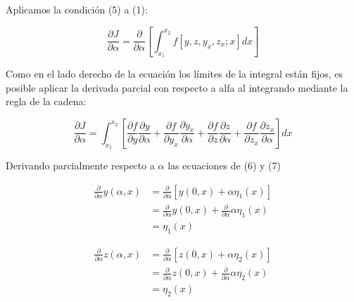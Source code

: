 
\vspace{0.5cm}

Aplicamos la condición (5) a (1):

\begin{equation*}
    \frac{\partial J}{\partial \alpha} =
    \frac{\partial}{\partial \alpha}
    \left[
        \int_{x_{1}}^{x_{2}}
        f\left[ y, z, y_{x}, z_{x}; x \right]
        dx
        \right]
\end{equation*}

\vspace*{0.5cm}

Como en el lado derecho de la ecuación los límites de la integral están fijos, es posible aplicar la derivada parcial
con respecto a alfa al integrando mediante la regla de la cadena:

\vspace*{0.5cm}

\begin{equation}
    \frac{\partial J}{\partial \alpha} =
    \int_{x_{1}}^{x_{2}}
    \left[
        \frac{\partial f}{\partial y} \frac{\partial y}{\partial \alpha} +
        \frac{\partial f}{\partial y_{x}} \frac{\partial y_{x}}{\partial \alpha} +
        \frac{\partial f}{\partial z} \frac{\partial z}{\partial \alpha} +
        \frac{\partial f}{\partial z_{x}} \frac{\partial z_{x}}{\partial \alpha}
        \right]
    dx
\end{equation}

\vspace*{0.5cm}

Derivando parcialmente respecto a $\alpha$ las ecuaciones de (6) y (7)

\begin{align*}
    \frac{\partial}{\partial \alpha} y(\alpha,x) & = \frac{\partial}{\partial \alpha} \left[ y(0,x) + \alpha \eta_{1} (x) \right]                    \\
                                                 & = \frac{\partial}{\partial \alpha}  y(0,x) + \frac{\partial}{\partial \alpha} \alpha \eta_{1} (x) \\
                                                 & = \eta_{1} (x)
\end{align*}

\vspace*{0.5cm}

\begin{align*}
    \frac{\partial}{\partial \alpha} z(\alpha,x) & = \frac{\partial}{\partial \alpha} \left[ z(0,x) + \alpha \eta_{2} (x) \right]                    \\
                                                 & = \frac{\partial}{\partial \alpha}  z(0,x) + \frac{\partial}{\partial \alpha} \alpha \eta_{2} (x) \\
                                                 & = \eta_{2} (x)
\end{align*}


